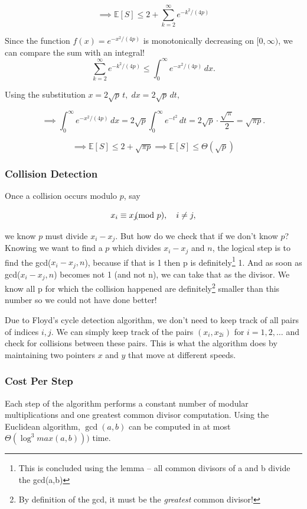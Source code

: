 \[
\implies
\mathbb{E}[S]
\le 
2
+
\sum_{k=2}^{\infty}
e^{-k^2/(4p)}
\]

\vspace{1em}
Since the function $f(x)=e^{-x^2/(4p)}$ is monotonically decreasing on \([0,\infty)\), 
we can compare the sum with an integral!
\[
\sum_{k=2}^{\infty}
e^{-k^2/(4p)}
\le
\int_0^{\infty}
e^{-x^2/(4p)}\,dx.
\]

Using the substitution $x=2\sqrt{p}\,t,\; dx=2\sqrt{p}\,dt,$


\[
\implies
\int_0^{\infty}
e^{-x^2/(4p)}\,dx
=
2\sqrt{p}
\int_0^{\infty}
e^{-t^2}\,dt
=
2\sqrt{p}\cdot \frac{\sqrt{\pi}}{2}
=
\sqrt{\pi p}.
\]



\[
\implies
\mathbb{E}[S]
\le
2+\sqrt{\pi p}
\implies
\mathbb{E}[S]\le \Theta(\sqrt{p})
\]


\subsubsection{Collision Detection}

Once a collision occurs modulo \(p\), say

\[
x_i \equiv x_j \hspace{-0.7em}\pmod p,
\quad i \ne j,
\]

we know $p$ must divide \(x_i-x_j\). But how do we check that if we don't know $p$?
Knowing we want to find a $p$ which divides \(x_i-x_j\) and $n$, the logical step 
is to find the gcd(\(x_i-x_j,n\)), because if that is 1 then p is 
definitely\footnote{This is concluded using the lemma -- all common divisors of a and b divide the gcd(a,b)} 1.
And as soon as gcd(\(x_i-x_j,n\)) becomes not 1 (and not n), we can take that as the divisor. We know all p for 
which the collision happened are definitely\footnote{By definition of the gcd, it must be the \emph{greatest} common divisor!} smaller than this number so we could not have done better!

Due to Floyd's cycle detection algorithm, we don't need to keep track of all pairs 
of indices \(i,j\). We can simply keep track of the pairs \((x_i,x_{2i})\) 
for \(i=1,2,\dots\) and check for collisions between these pairs. This is 
what the algorithm does by maintaining two pointers \(x\) and \(y\) that move at different speeds.\\


\subsubsection{Cost Per Step}
Each step of the algorithm performs a constant number of 
modular multiplications and one greatest common divisor computation. Using the Euclidean 
algorithm, $\gcd(a,b)$ can be computed in at most \(\Theta(\log^3 max(a,b)))\) time.

